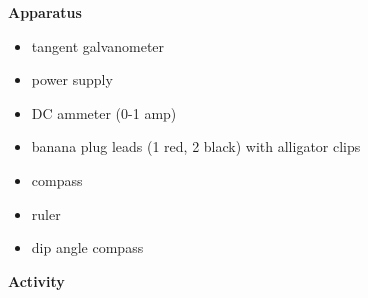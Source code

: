 \textbf{Apparatus}

\begin{itemize}
\item tangent galvanometer 
\item power supply 
\item DC ammeter (0-1 amp)
\item banana plug leads (1 red, 2 black) with alligator clips
\item compass
\item ruler 
\item dip angle compass 
\end{itemize}
\vspace{15mm}
\textbf{Activity}

